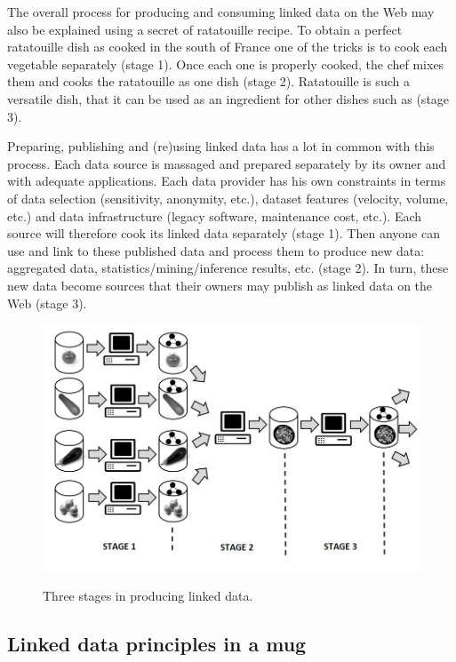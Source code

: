 The overall process for producing and consuming linked data on the Web
may also be explained using a secret of ratatouille recipe. To obtain a
perfect ratatouille dish as cooked in the south of France one of the
tricks is to cook each vegetable separately (stage 1). Once each one is
properly cooked, the chef mixes them and cooks the ratatouille as one
dish (stage 2). Ratatouille is such a versatile dish, that it can be
used as an ingredient for other dishes such as (stage 3).

Preparing, publishing and (re)using linked data has a lot in common with
this process. Each data source is massaged and prepared separately by
its owner and with adequate applications. Each data provider has his own
constraints in terms of data selection (sensitivity, anonymity, etc.),
dataset features (velocity, volume, etc.) and data infrastructure
(legacy software, maintenance cost, etc.). Each source will therefore
cook its linked data separately (stage 1). Then anyone can use and link
to these published data and process them to produce new data: aggregated
data, statistics/mining/inference results, etc. (stage 2). In turn,
these new data become sources that their owners may publish as linked
data on the Web (stage 3).

\begin{figure}

\includegraphics[width=5in]{media/figure-05-13x}
\label{fig:ch5.13x}
\caption{Three stages in producing linked data.}
\end{figure}

\hypertarget{linked-data-principles-in-a-mug}{%
\subsection{Linked data principles in a
mug}\label{linked-data-principles-in-a-mug}}

